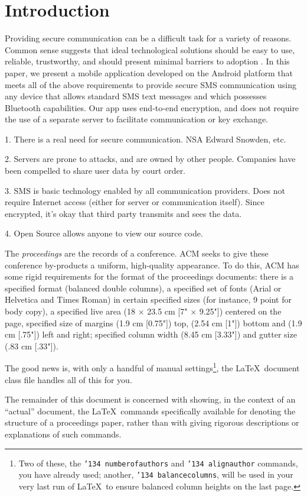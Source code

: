 \section{Introduction}
Providing secure communication can be a difficult task for a variety of reasons. Common sense suggests that ideal technological solutions should be easy to use, reliable, trustworthy, and should present minimal barriers to adoption . In this paper, we present a mobile application developed on the Android platform that meets all of the above requirements to provide secure SMS communication using any device that allows standard SMS text messages and which possesses Bluetooth capabilities. Our app uses end-to-end encryption, and does not require the use of a separate server to facilitate communication or key exchange.

1. There is a real need for secure communication. NSA Edward Snowden, etc.

2. Servers are prone to attacks, and are owned by other people. Companies have been compelled to share user data by court order.

3. SMS is basic technology enabled by all communication providers. Does not require Internet access (either for server or communication itself). Since encrypted, it's okay that third party transmits and sees the data.

4. Open Source allows anyone to view our source code.

The \textit{proceedings} are the records of a conference.
ACM seeks to give these conference by-products a uniform,
high-quality appearance.  To do this, ACM has some rigid
requirements for the format of the proceedings documents: there
is a specified format (balanced  double columns), a specified
set of fonts (Arial or Helvetica and Times Roman) in
certain specified sizes (for instance, 9 point for body copy),
a specified live area (18 $\times$ 23.5 cm [7" $\times$ 9.25"]) centered on
the page, specified size of margins (1.9 cm [0.75"]) top, (2.54 cm [1"]) bottom
and (1.9 cm [.75"]) left and right; specified column width
(8.45 cm [3.33"]) and gutter size (.83 cm [.33"]).

The good news is, with only a handful of manual
settings\footnote{Two of these, the {\texttt{\char'134 numberofauthors}}
and {\texttt{\char'134 alignauthor}} commands, you have
already used; another, {\texttt{\char'134 balancecolumns}}, will
be used in your very last run of \LaTeX\ to ensure
balanced column heights on the last page.}, the \LaTeX\ document
class file handles all of this for you.

The remainder of this document is concerned with showing, in
the context of an ``actual'' document, the \LaTeX\ commands
specifically available for denoting the structure of a
proceedings paper, rather than with giving rigorous descriptions
or explanations of such commands.
